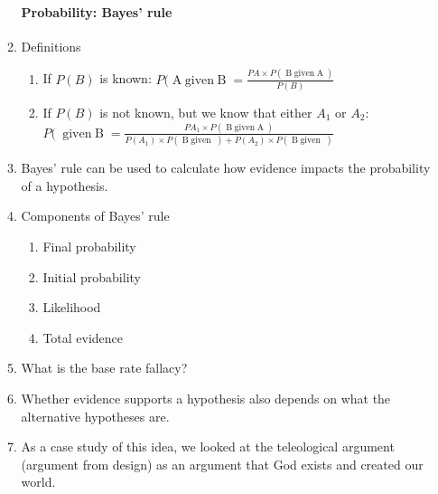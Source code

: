\documentclass[10pt,landscape]{article}
\newcommand\given[2]{\mathop{\mbox{$#1\; given\; #2$}}}
\begin{document}
\begin{multicols}{2}
\begin{enumerate}
\begin{enumerate}
\paragraph{Probability: Bayes' rule}
    \item Definitions
          \begin{enumerate}
     \item If $P(B)$ is known: $P(\given{A}{B}=\frac{P{A}\times P(\given{B}{A})}{P(B)}$
     \item If $P(B)$ is not known, but we know that either $A_1$ or $A_2$: $P(\given{A_1}{B}=\frac{P{A_1}\times P(\given{B}{A})}{P(A_1)\times P(\given{B}{A_1})+P(A_2)\times P(\given{B}{A_2})}$
    \end{enumerate}
    \item Bayes' rule can be used to calculate how evidence impacts the probability of a hypothesis.
    \item Components of Bayes' rule
      \begin{enumerate}
       \item Final probability
       \item Initial probability
       \item Likelihood
       \item Total evidence
      \end{enumerate}
    \item What is the base rate fallacy?
    \item Whether evidence supports a hypothesis also depends on what the alternative hypotheses are.
    \item As a case study of this idea, we looked at the teleological argument (argument from design) as an argument that God exists and created our world.


\end{enumerate}
\end{enumerate}
\end{multicols}
\end{document}

